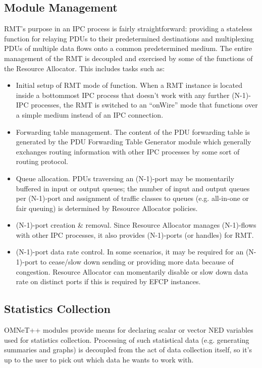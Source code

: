         \subsection{Module Management}
            RMT's purpose in an IPC process is fairly straightforward: providing a stateless function for relaying PDUs to their predetermined destinations and multiplexing PDUs of multiple data flows onto a common predetermined medium. The entire management of the RMT is decoupled and exercised by some of the functions of the Resource Allocator. This includes tasks such as:

            \begin{itemize}
                \item Initial setup of RMT mode of function. When a RMT instance is located inside a bottommost IPC process that doesn't work with any further (N-1)-IPC processes, the RMT is switched to an ``onWire'' mode that functions over a simple medium instead of an IPC connection.
                \item Forwarding table management. The content of the PDU forwarding table is generated by the PDU Forwarding Table Generator module which generally exchanges routing information with other IPC processes by some sort of routing protocol.
                \item Queue allocation. PDUs traversing an (N-1)-port may be momentarily buffered in input or output queues; the number of input and output queues per (N-1)-port and assignment of traffic classes to queues (e.g. all-in-one or fair queuing) is determined by Resource Allocator policies.
                \item (N-1)-port creation \& removal. Since Resource Allocator manages (N-1)-flows with other IPC processes, it also provides (N-1)-ports (or handles) for RMT.
                \item (N-1)-port data rate control. In some scenarios, it may be required for an (N-1)-port to cease/slow down sending or providing more data because of congestion. Resource Allocator can momentarily disable or slow down data rate on distinct ports if this is required by EFCP instances.
            \end{itemize}

        \subsection{Statistics Collection}
            OMNeT++ modules provide means for declaring scalar or vector NED variables used for statistics collection. Processing of such statistical data (e.g. generating summaries and graphs) is decoupled from the act of data collection itself, so it's up to the user to pick out which data he wants to work with.

